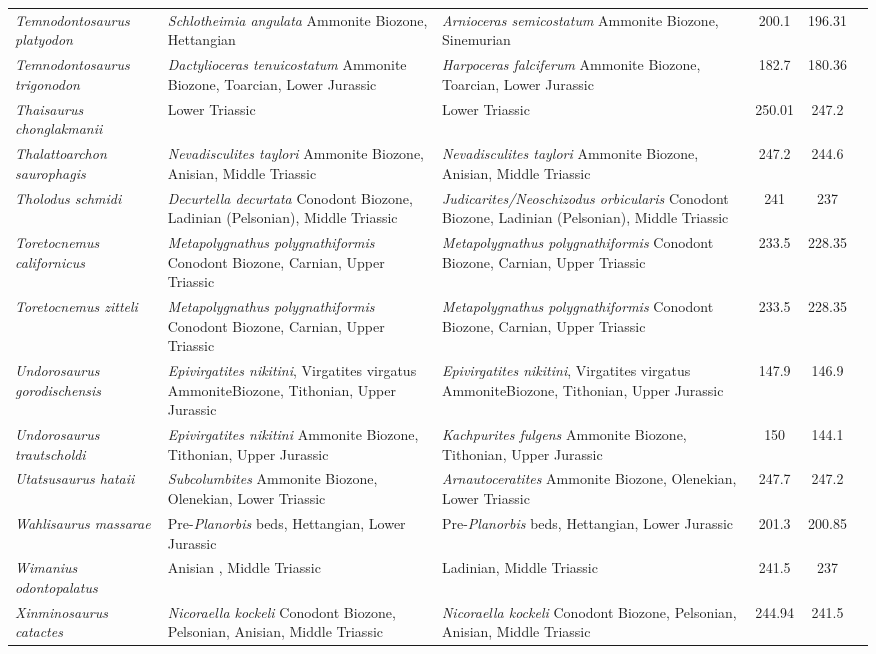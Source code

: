 \begin{longtabu}{>{\itshape}lXXSSl}
	Temnodontosaurus platyodon & \emph{Schlotheimia angulata} Ammonite Biozone, Hettangian & \emph{Arnioceras semicostatum} Ammonite Biozone, Sinemurian & 200.1 & 196.31 & \cite{McGowan1974} \\
	Temnodontosaurus trigonodon & \emph{Dactylioceras tenuicostatum} Ammonite Biozone, Toarcian, Lower Jurassic & \emph{Harpoceras falciferum} Ammonite Biozone, Toarcian, Lower Jurassic & 182.7 & 180.36 & \cite{Fraas1891,Huene1922b} \\
	Thaisaurus chonglakmanii & Lower Triassic & Lower Triassic & 250.01 & 247.2 & \cite{Mazin1991} \\
	Thalattoarchon saurophagis & \emph{Nevadisculites taylori} Ammonite Biozone, Anisian, Middle Triassic & \emph{Nevadisculites taylori} Ammonite Biozone, Anisian, Middle Triassic & 247.2 & 244.6 & \cite{Frobisch2013} \\
	Tholodus schmidi & \emph{Decurtella decurtata} Conodont Biozone, Ladinian (Pelsonian), Middle Triassic & \emph{Judicarites/Neoschizodus orbicularis} Conodont Biozone, Ladinian (Pelsonian), Middle Triassic & 241 & 237 & \cite{DallaVecchia2004} \\
	Toretocnemus californicus & \emph{Metapolygnathus polygnathiformis} Conodont Biozone, Carnian, Upper Triassic & \emph{Metapolygnathus polygnathiformis} Conodont Biozone, Carnian, Upper Triassic & 233.5 & 228.35 & \cite{Merriam1903,McGowan2003} \\
	Toretocnemus zitteli & \emph{Metapolygnathus polygnathiformis} Conodont Biozone, Carnian, Upper Triassic & \emph{Metapolygnathus polygnathiformis} Conodont Biozone, Carnian, Upper Triassic & 233.5 & 228.35 & \cite{Merriam1903,McGowan2003} \\
	Undorosaurus gorodischensis & \emph{Epivirgatites nikitini}, Virgatites virgatus AmmoniteBiozone, Tithonian, Upper Jurassic & \emph{Epivirgatites nikitini}, Virgatites virgatus AmmoniteBiozone, Tithonian, Upper Jurassic & 147.9 & 146.9 & \cite{Efimov1999a} \\
	Undorosaurus trautscholdi & \emph{Epivirgatites nikitini} Ammonite Biozone, Tithonian, Upper Jurassic & \emph{Kachpurites fulgens} Ammonite Biozone, Tithonian, Upper Jurassic & 150 & 144.1 & \cite{Arkhangelsky2014} \\
	Utatsusaurus hataii & \emph{Subcolumbites} Ammonite Biozone, Olenekian, Lower Triassic & \emph{Arnautoceratites} Ammonite Biozone, Olenekian, Lower Triassic & 247.7 & 247.2 & \cite{Shikama1978} \\
	Wahlisaurus massarae & Pre-\emph{Planorbis} beds, Hettangian, Lower Jurassic & Pre-\emph{Planorbis} beds, Hettangian, Lower Jurassic & 201.3 & 200.85 & \cite{Lomax2016} \\
	Wimanius odontopalatus & Anisian , Middle Triassic & Ladinian, Middle Triassic & 241.5 & 237 & \cite{Maisch1998a} \\
	Xinminosaurus catactes & \emph{Nicoraella kockeli} Conodont Biozone, Pelsonian, Anisian, Middle Triassic & \emph{Nicoraella kockeli} Conodont Biozone, Pelsonian, Anisian, Middle Triassic & 244.94 & 241.5 & \cite{Jiang2008a} \\
\end{longtabu}